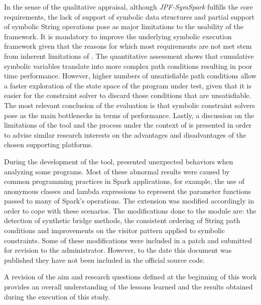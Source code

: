 In the sense of the qualitative appraisal, although \textit{JPF-SymSpark} fulfills the core requirements, the lack of support of symbolic data structures and partial support of symbolic String operations pose as major limitations to the usability of the framework. It is mandatory to improve the underlying symbolic execution framework given that the reasons for which most requirements are not met stem from inherent limitations of \spf{}. The quantitative assessment shows that cumulative symbolic variables translate into more complex path conditions resulting in poor time performance. However, higher numbers of unsatisfiable path conditions allow a faster exploration of the state space of the program under test, given that it is easier for the constraint solver to discard those conditions that are unsatisfiable. The most relevant conclusion of the evaluation is that symbolic constraint solvers pose as the main bottlenecks in terms of performance. Lastly, a discussion on the limitations of the tool and the process under the context of \jpf{} is presented in order to advise similar research interests on the advantages and disadvantages of the chosen supporting platforms.

During the development of the tool, \spf{} presented unexpected behaviors when analyzing some programs. Most of these abnormal results were caused by common programming practices in Spark applications, for example, the use of anonymous classes and lambda expressions to represent the parameter functions passed to many of Spark's operations. The \spf{} extension was modified accordingly in order to cope with these scenarios. The modifications done to the \spf{} module are: the detection of synthetic bridge methods, the consistent ordering of String path conditions and improvements on the visitor pattern applied to symbolic constraints. Some of these modifications were included in a patch and submitted for revision to the \spf{} administrator. However, to the date this document was published they have not been included in the official source code.


A revision of the aim and research questions defined at the beginning of this work provides an overall understanding of the lessons learned and the results obtained during the execution of this study.

